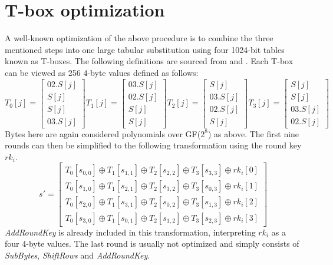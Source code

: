 \documentclass[thesis=B,english]{FITthesis}[2019/03/06]
\begin{document}
\section{T-box optimization}
A well-known optimization of the above procedure is to combine the three mentioned steps into one large tabular substitution using four 1024-bit tables known as T-boxes.
The following definitions are sourced from \cite{TBOX} and \cite{bernstein2005cache}.
Each T-box can be viewed as 256 4-byte values defined as follows:
$$
T_0[j] = \begin{bmatrix} 02.S[j] \\ S[j] \\ S[j] \\ 03.S[j] \end{bmatrix}
T_1[j] = \begin{bmatrix} 03.S[j] \\ 02.S[j] \\ S[j] \\ S[j] \end{bmatrix}
T_2[j] = \begin{bmatrix} S[j] \\ 03.S[j] \\ 02.S[j] \\ S[j] \end{bmatrix}
T_3[j] = \begin{bmatrix} S[j] \\ S[j] \\ 03.S[j] \\ 02.S[j] \end{bmatrix}
$$
Bytes here are again considered polynomials over GF($2^8$) as above.
The first nine rounds can then be simplified to the following transformation using the round key $rk_i$.
\begin{equation}
\label{eq:tboxround}
s' = \begin{bmatrix}
	T_0[s_{0,0}] \oplus T_1[s_{1,1}] \oplus T_2[s_{2,2}] \oplus T_3[s_{3,3}] \oplus rk_i[0] \\
	T_0[s_{1,0}] \oplus T_1[s_{2,1}] \oplus T_2[s_{3,2}] \oplus T_3[s_{0,3}] \oplus rk_i[1] \\
	T_0[s_{2,0}] \oplus T_1[s_{3,1}] \oplus T_2[s_{0,2}] \oplus T_3[s_{1,3}] \oplus rk_i[2] \\
	T_0[s_{3,0}] \oplus T_1[s_{0,1}] \oplus T_2[s_{1,2}] \oplus T_3[s_{2,3}] \oplus rk_i[3]
\end{bmatrix}
\end{equation}
\textit{AddRoundKey} is already included in this transformation, interpreting $rk_i$ as a four 4-byte values.
The last round is usually not optimized and simply consists of \textit{SubBytes}, \textit{ShiftRows} and \textit{AddRoundKey}.
\end{document}

